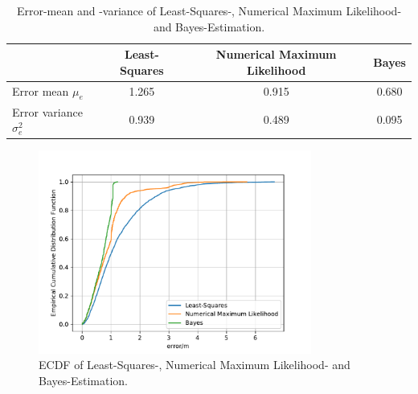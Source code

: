 \documentclass{article}
\begin{document}
\begin{table}[h]
\centering
\begin{tabular}{l||c||c||c|}
\cline{2-4}
                                                   & Least-Squares & Numerical Maximum Likelihood & Bayes  \\ \hline \hline
\multicolumn{1}{|l||}{Error mean $\mu_e$}           & 1.265              & 0.915                       & 0.680 \\ \hline
\multicolumn{1}{|l||}{Error variance $\sigma^2_e$} &  0.939 & 0.489                       & 0.095 \\ \hline
\end{tabular}
\caption{Error-mean and -variance of Least-Squares-, Numerical Maximum Likelihood- and Bayes-Estimation.}
\label{tab:scen3_mean_var}
\end{table}

\begin{figure}[h]
\centering
\includegraphics[width=0.8\textwidth]{./Figures/scenario3_ecdf_all.pdf}
\caption{ECDF of Least-Squares-, Numerical Maximum Likelihood- and Bayes-Estimation.}
\label{fig:scenario3_ecdf_all}
\end{figure}
\end{document}
